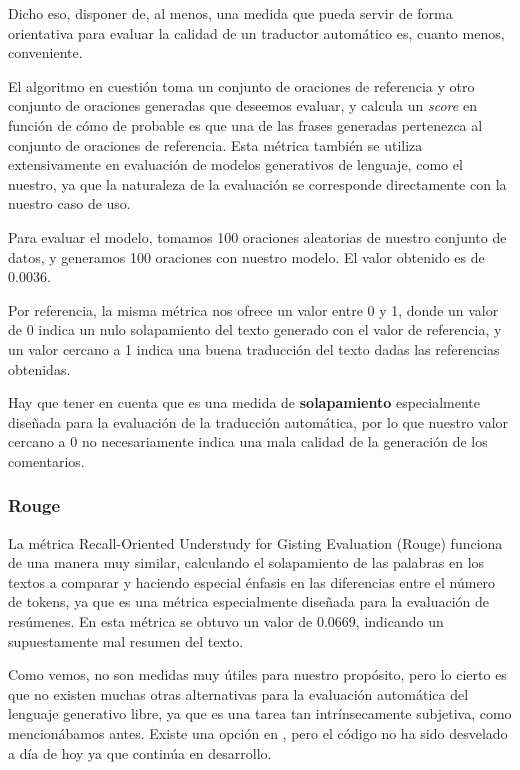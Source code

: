 Dicho eso, disponer de, al menos, una medida que pueda servir de forma orientativa para evaluar la calidad de un traductor automático es, cuanto menos, conveniente.

El algoritmo en cuestión toma un conjunto de oraciones de referencia y otro conjunto de oraciones generadas que deseemos evaluar, y calcula un \textit{score} en función de cómo de probable es que una de las frases generadas pertenezca al conjunto de oraciones de referencia. Esta métrica también se utiliza extensivamente en evaluación de modelos generativos de lenguaje, como el nuestro, ya que la naturaleza de la evaluación se corresponde directamente con la nuestro caso de uso.


Para evaluar el modelo, tomamos 100 oraciones aleatorias de nuestro conjunto de datos, y generamos 100 oraciones con nuestro modelo. El valor obtenido es de 0.0036. 

Por referencia, la misma métrica nos ofrece un valor entre 0 y 1, donde un valor de 0 indica un nulo solapamiento del texto generado con el valor de referencia, y un valor cercano a 1 indica una buena traducción del texto dadas las referencias obtenidas.

Hay que tener en cuenta que es una medida de \textbf{solapamiento} especialmente diseñada para la evaluación de la traducción automática, por lo que nuestro valor cercano a 0 no necesariamente indica una mala calidad de la generación de los comentarios.

\subsubsection{Rouge}
La métrica Recall-Oriented Understudy for Gisting Evaluation (Rouge) funciona de una manera muy similar, calculando el solapamiento de las palabras en los textos a comparar y haciendo especial énfasis en las diferencias entre el número de tokens, ya que es una métrica especialmente diseñada para la evaluación de resúmenes. En esta métrica se obtuvo un valor de 0.0669, indicando un supuestamente mal resumen del texto. 

Como vemos, no son medidas muy útiles para nuestro propósito, pero lo cierto es que no existen muchas otras alternativas para la evaluación automática del lenguaje generativo libre, ya que es una tarea tan intrínsecamente subjetiva, como mencionábamos antes. Existe una opción en \cite{yuan2021bartscore}, pero el código no ha sido desvelado a día de hoy ya que continúa en desarrollo. 

